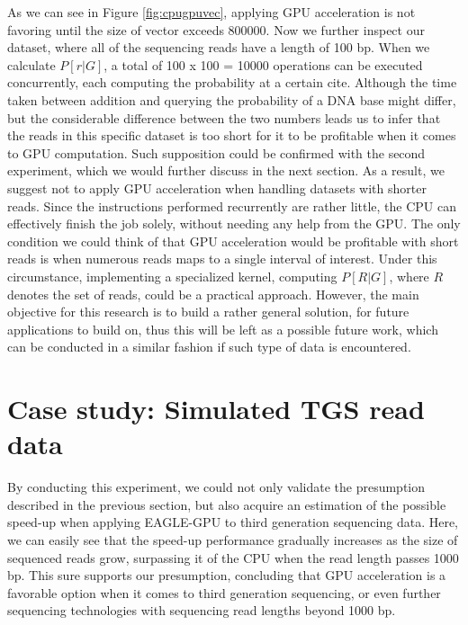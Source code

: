 \documentclass{PHlab-thesis}
\begin{document}
As we can see in Figure \ref{fig:cpugpuvec}, applying GPU acceleration is not favoring until the size of vector exceeds 800000. Now we further inspect our dataset, where all of the sequencing reads have a length of 100 bp. When we calculate $P[r|G]$, a total of 100 x 100 = 10000 operations can be executed concurrently, each computing the probability at a certain cite. Although the time taken between addition and querying the probability of a DNA base might differ, but the considerable difference between the two numbers leads us to infer that the reads in this specific dataset is too short for it to be profitable when it comes to GPU computation. Such supposition could be confirmed with the second experiment, which we would further discuss in the next section. As a result, we suggest not to apply GPU acceleration when handling datasets with shorter reads. Since the instructions performed recurrently are rather little, the CPU can effectively finish the job solely, without needing any help from the GPU. The only condition we could think of that GPU acceleration would be profitable with short reads is when numerous reads maps to a single interval of interest. Under this circumstance, implementing a specialized kernel, computing $P[R|G]$, where $R$ denotes the set of reads, could be a practical approach. However, the main objective for this research is to build a rather general solution, for future applications to build on, thus this will be left as a possible future work, which can be conducted in a similar fashion if such type of data is encountered.

\section{Case study: Simulated TGS read data}
By conducting this experiment, we could not only validate the presumption described in the previous section, but also acquire an estimation of the possible speed-up when applying EAGLE-GPU to third generation sequencing data. Here, we can easily see that the speed-up performance gradually increases as the size of sequenced reads grow, surpassing it of the CPU when the read length passes 1000 bp. This sure supports our presumption, concluding that GPU acceleration is a favorable option when it comes to third generation sequencing, or even further sequencing technologies with sequencing read lengths beyond 1000 bp.
\end{document}
